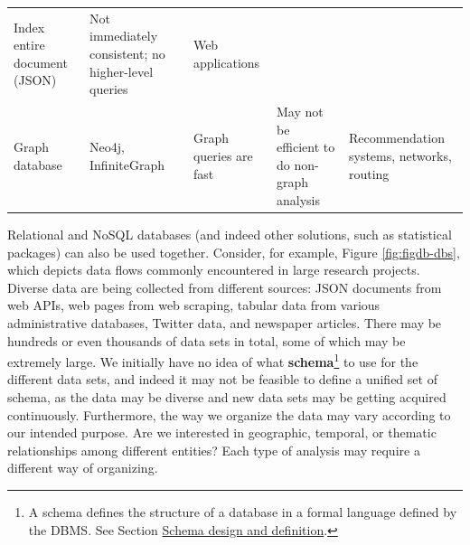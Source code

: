 \documentclass[]{krantz}
\begin{document}
\begin{longtable}[]{@{}lllll@{}}
\begin{minipage}[t]{0.22\columnwidth}
Index entire document (JSON)\strut
\end{minipage} & \begin{minipage}[t]{0.20\columnwidth}\raggedright\strut
Not immediately consistent; no higher-level queries\strut
\end{minipage} & \begin{minipage}[t]{0.21\columnwidth}\raggedright\strut
Web applications\strut
\end{minipage}\tabularnewline
\begin{minipage}[t]{0.07\columnwidth}\raggedright\strut
Graph database\strut
\end{minipage} & \begin{minipage}[t]{0.16\columnwidth}\raggedright\strut
Neo4j, InfiniteGraph\strut
\end{minipage} & \begin{minipage}[t]{0.22\columnwidth}\raggedright\strut
Graph queries are fast\strut
\end{minipage} & \begin{minipage}[t]{0.20\columnwidth}\raggedright\strut
May not be efficient to do non-graph analysis\strut
\end{minipage} & \begin{minipage}[t]{0.21\columnwidth}\raggedright\strut
Recommendation systems, networks, routing\strut
\end{minipage}\tabularnewline
\bottomrule
\end{longtable}

Relational and NoSQL databases (and indeed other solutions, such as
statistical packages) can also be used together. Consider, for example,
Figure \ref{fig:figdb-dbs}, which depicts data flows commonly
encountered in large research projects. Diverse data are being collected
from different sources: JSON documents from web APIs, web pages from web
scraping, tabular data from various administrative databases, Twitter
data, and newspaper articles. There may be hundreds or even thousands of
data sets in total, some of which may be extremely large. We initially
have no idea of what \textbf{schema}\footnote{A schema defines the
  structure of a database in a formal language defined by the DBMS. See
  Section \protect\hyperlink{sec:db:schema}{Schema design and
  definition}.} to use for the different data sets, and indeed it may
not be feasible to define a unified set of schema, as the data may be
diverse and new data sets may be getting acquired continuously.
Furthermore, the way we organize the data may vary according to our
intended purpose. Are we interested in geographic, temporal, or thematic
relationships among different entities? Each type of analysis may
require a different way of organizing.
\end{document}
